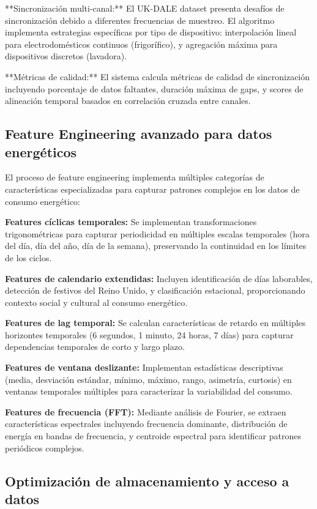**Sincronización multi-canal:** El UK-DALE dataset presenta desafíos de sincronización debido a diferentes frecuencias de muestreo. El algoritmo implementa estrategias específicas por tipo de dispositivo: interpolación lineal para electrodomésticos continuos (frigorífico), y agregación máxima para dispositivos discretos (lavadora).

**Métricas de calidad:** El sistema calcula métricas de calidad de sincronización incluyendo porcentaje de datos faltantes, duración máxima de gaps, y scores de alineación temporal basados en correlación cruzada entre canales.

\subsection{Feature Engineering avanzado para datos energéticos}

El proceso de feature engineering implementa múltiples categorías de características especializadas para capturar patrones complejos en los datos de consumo energético:

\textbf{Features cíclicas temporales:} Se implementan transformaciones trigonométricas para capturar periodicidad en múltiples escalas temporales (hora del día, día del año, día de la semana), preservando la continuidad en los límites de los ciclos.

\textbf{Features de calendario extendidas:} Incluyen identificación de días laborables, detección de festivos del Reino Unido, y clasificación estacional, proporcionando contexto social y cultural al consumo energético.

\textbf{Features de lag temporal:} Se calculan características de retardo en múltiples horizontes temporales (6 segundos, 1 minuto, 24 horas, 7 días) para capturar dependencias temporales de corto y largo plazo.

\textbf{Features de ventana deslizante:} Implementan estadísticas descriptivas (media, desviación estándar, mínimo, máximo, rango, asimetría, curtosis) en ventanas temporales múltiples para caracterizar la variabilidad del consumo.

\textbf{Features de frecuencia (FFT):} Mediante análisis de Fourier, se extraen características espectrales incluyendo frecuencia dominante, distribución de energía en bandas de frecuencia, y centroide espectral para identificar patrones periódicos complejos.

\subsection{Optimización de almacenamiento y acceso a datos}

